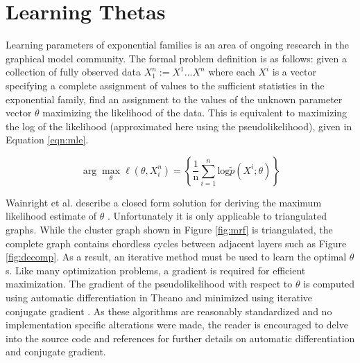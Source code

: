\documentclass{article} %
\begin{document}
\section{Learning Thetas}
Learning parameters of exponential families is an area of ongoing research in
the graphical model community. The formal problem definition is as follows:
given a collection of fully observed data $X_1^n := {X^1...X^n}$ where each
$X^i$ is a vector specifying a complete assignment of values to the sufficient
statistics in the exponential family, find an assignment to the values of the
unknown parameter vector $\theta$ maximizing the likelihood of the data. This
is equivalent to maximizing the log of the likelihood (approximated here using
the pseudolikelihood), given in Equation \ref{eqn:mle}.

\begin{equation}
\arg\max_\theta \ell(\theta,X_i^n)
=
\left\{
  \frac{1}{\textrm{n}}\sum_{i=1}^{n}\textrm{log}\tilde{p}(X^i; \theta)
\right\}
\label{eqn:mle}
\end{equation}

Wainright et al. describe a closed form solution for deriving the maximum
likelihood estimate of $\theta$ \cite{wainwright08}. Unfortunately it is only
applicable to triangulated graphs. While the cluster graph shown in Figure
\ref{fig:mrf} is triangulated, the complete graph contains chordless cycles
between adjacent layers such as Figure \ref{fig:decomp}. As a result, an
iterative method must be used to learn the optimal $\theta$s. Like many
optimization problems, a gradient is required for efficient maximization. The
gradient of the pseudolikelihood with respect to $\theta$ is computed using
automatic differentiation in Theano \cite{bergstra10} and minimized using
iterative conjugate gradient \cite{hestenes52}. As these algorithms are
reasonably standardized and no implementation specific alterations were made,
the reader is encouraged to delve into the source code and references for
further details on automatic differentiation and conjugate gradient.
\end{document}
